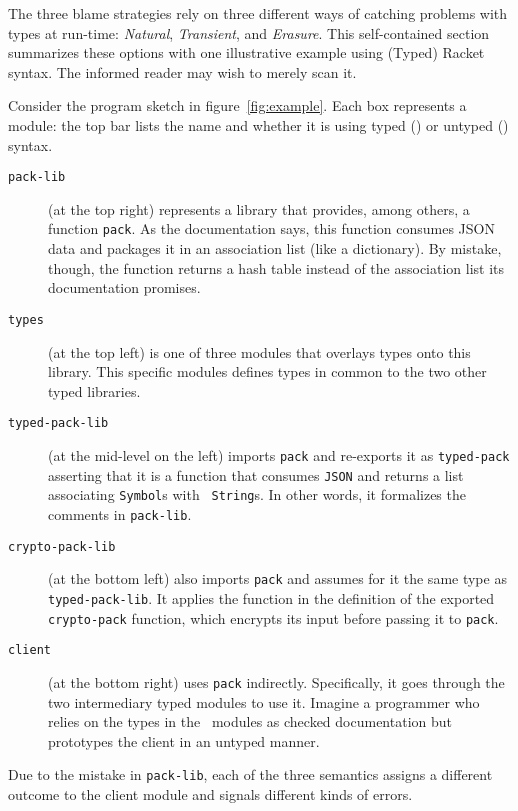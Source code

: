 
The three blame strategies rely on three different ways of catching problems
with types at run-time: {\em Natural\/}, {\em Transient\/}, and {\em
Erasure\/}. This self-contained section summarizes these options with one
illustrative example using (Typed) Racket syntax. The informed reader may wish to merely
scan it.

Consider the program sketch in figure~\ref{fig:example}. Each box represents a
module: the top bar lists the name and whether it is using typed (\typecolor) or
untyped (\dyncolor) syntax.
\begin{description}

\item[\texttt{pack-lib}] (at the top right) represents a library that provides,
among others, a function {\tt pack}. As the documentation says, this function
consumes JSON data and packages it in an association list (like a dictionary). By mistake, though, the
function returns a hash table instead of the association list its documentation
promises.

\item[\texttt{types}] (at the top left) is one of three modules that overlays
types onto this library. This specific modules defines types in common to the
two other typed libraries. 

\item[\texttt{typed-pack-lib}] (at the mid-level on the left) imports {\tt pack}
and re-exports it as \texttt{typed-pack} asserting that it is a function that
consumes {\tt JSON} and returns a list associating {\tt Symbol}s with {\tt
String}s. In other words, it formalizes the comments in {\tt pack-lib}.

\item[\texttt{crypto-pack-lib}] (at the bottom left) also imports \texttt{pack}
and assumes for it the same type as {\tt typed-pack-lib}. It applies the
function in the definition of the exported {\tt crypto-pack} function, which
encrypts its input before passing it to \texttt{pack}.

\item[\texttt{client}] (at the bottom right) uses {\tt pack}
indirectly. Specifically, it goes through the two intermediary typed modules to
use it. Imagine a programmer who relies on the types in the \typecolor\
modules as checked documentation but prototypes the client in an untyped manner.

\end{description}
Due to the mistake in {\tt pack-lib}, each of the three semantics assigns a
different outcome to the client module and signals different kinds of errors.

